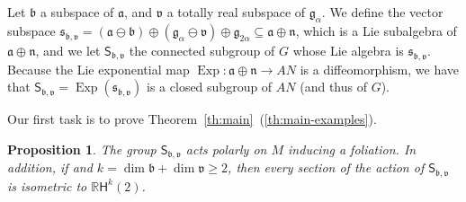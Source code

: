 \documentclass[12pt, a4paper]{amsart}
\newcommand{\g}{\mathfrak}
\newcommand{\s}{\mathsf}
\newcommand{\R}{\mathbb{R}}
\newcommand{\Exp}{\operatorname{Exp}}
\newtheorem{proposition}[theorem]{Proposition}
\theoremstyle{definition}
\begin{document}
Let $\g{b}$ a subspace of $\g{a}$, and $\g{v}$ a totally real subspace of $\g{g}_\alpha$.
We define the vector subspace $\g{s}_{\g{b},\g{v}}=(\g{a}\ominus\g{b})\oplus(\g{g}_\alpha\ominus\g{v})\oplus\g{g}_{2\alpha}\subseteq \g{a}\oplus \g{n}$,
which is a Lie subalgebra of $\g{a}\oplus \g{n}$,
and we let $\s{S}_{\g{b},\g{v}}$ the connected subgroup of $G$ whose Lie algebra is $\g{s}_{\g{b},\g{v}}$.
Because the Lie exponential map $\Exp\colon \g{a}\oplus\g{n}\to AN$ is a diffeomorphism, we have that
$\s{S}_{\g{b},\g{v}}=\Exp(\g{s}_{\g{b},\g{v}})$ is a closed subgroup of $AN$ (and thus of $G$).

Our first task is to prove Theorem~\ref{th:main}~(\ref{th:main-examples}).

\begin{proposition}\label{prop:examples}
The group $\s{S}_{\g{b},\g{v}}$ acts polarly on $M$ inducing a foliation.
In addition,
if and $k=\dim \g{b}+\dim\g{v}\geq 2$, then
every section of the action of $\s{S}_{\g{b},\g{v}}$ is isometric to $\R\s{H}^{k}(2)$.
\end{proposition}
\end{document}
